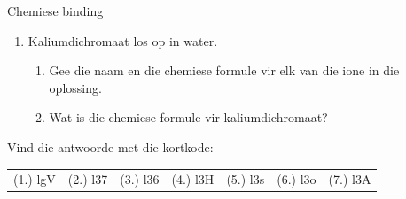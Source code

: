 \begin{eocexercises}{Chemiese binding}
\begin{enumerate}[noitemsep, label=\textbf{\arabic*}. ]
              \label{m38689*uid185}\item Kaliumdichromaat los op in water.
\label{m38689*id148361}\begin{enumerate}[noitemsep, label=\textbf{\alph*}. ] 
            \label{m38689*uid186}\item Gee die naam en die chemiese formule vir elk van die ione in die oplossing.
\label{m38689*uid187}\item Wat is die chemiese formule vir kaliumdichromaat?
\end{enumerate}
                \end{enumerate}
  \label{m38689**end}
  \label{6cd7661dc7a31822d94f8eef4ac8e3a5**end}
\par {} Vind die antwoorde met die kortkode:
 \par \begin{tabular}[h]{cccccc}
 (1.) lgV  &  (2.) l37  &  (3.) l36  &  (4.) l3H  &  (5.) l3s  &  (6.) l3o  &  (7.) l3A  & \end{tabular}
\end{eocexercises}
